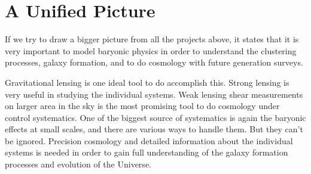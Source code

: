 \documentclass[
  11pt,
  twoside,
  openright,
  titlepage,
  headings=optiontoheadandtoc
]{scrbook}
\begin{document}
\section{A Unified Picture}

If we try to draw a bigger picture from all the projects above, 
it states that it is very important to model baryonic physics 
in order to understand the clustering processes,
galaxy formation, and to do cosmology with future generation surveys. 

Gravitational lensing is one ideal tool to do accomplish this. Strong lensing
is very useful in studying the individual systems. 
Weak lensing shear measurements
on larger area in the sky is the most promising tool to do cosmology under
control systematics. One of the biggest source of systematics is again the 
baryonic effects at small scales, and there are various ways to handle them. But
they can't be ignored. Precision cosmology and detailed information about the 
individual systems is needed in order to gain full understanding of the 
galaxy formation processes and evolution of the Universe. 

\clearpage

\cleardoublepage
\backmatter
{}
\renewcommand{\bibname}{Bibliography}


\end{document}
